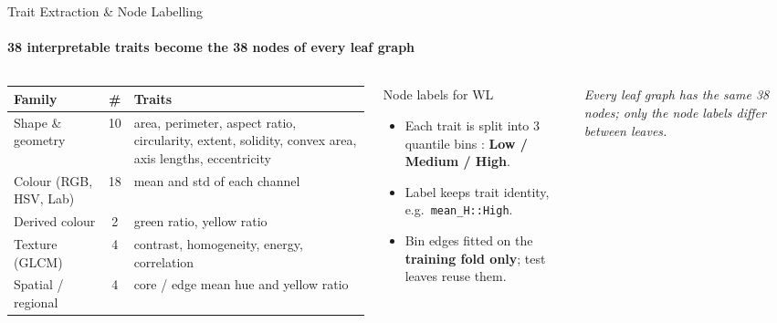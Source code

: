 \documentclass[aspectratio=169, 11pt]{beamer}
\begin{document}
\begin{frame}{Trait Extraction \& Node Labelling}
    \framesubtitle{38 interpretable traits become the 38 nodes of every leaf graph}
    \begin{columns}[T]
        \scriptsize
        \renewcommand{\arraystretch}{1.15}
        \begin{tabular}{@{}L{2.5cm}c L{4.6cm}@{}}
            \toprule
            \textbf{Family} & \textbf{\#} & \textbf{Traits} \\
            \midrule
            Shape \& geometry & 10 & area, perimeter, aspect ratio, circularity, extent, solidity, convex area, axis lengths, eccentricity \\
            Colour (RGB, HSV, Lab) & 18 & mean and std of each channel \\
            Derived colour & 2 & green ratio, yellow ratio \\
            Texture (GLCM) \cite{haralick1973textural} & 4 & contrast, homogeneity, energy, correlation \\
            Spatial / regional & 4 & core / edge mean hue and yellow ratio \\
            \bottomrule
        \end{tabular}

        \begin{block}{Node labels for WL}
            \scriptsize
            \begin{itemize}
                \item Each trait is split into 3 quantile bins \cite{dougherty1995supervised}: \textbf{Low / Medium / High}.
                \item Label keeps trait identity, e.g.\ \texttt{mean\_H::High}.
                \item Bin edges fitted on the \textbf{training fold only}; test leaves reuse them.
            \end{itemize}
        \end{block}
        \vspace{0.1cm}
        {\scriptsize\itshape Every leaf graph has the same 38 nodes; only the node labels differ between leaves.}
    \end{columns}
\end{frame}
\end{document}
